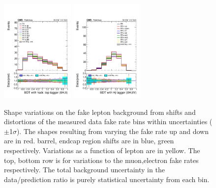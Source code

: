\begin{figure}[htb]
        \includegraphics[width=0.32\textwidth]{ch10_figs/kinMVA_2lss_e_ttbar_withBDTv8.pdf}
        \includegraphics[width=0.32\textwidth]{ch10_figs/kinMVA_2lss_e_ttV_withHj.pdf}
        \caption[Variations in discriminant shape due to fake rate systematics]{Shape variations on the fake lepton background from shifts and distortions
          of the measured data fake rate bins within uncertainties ($\pm$1$\sigma$). 
          The shapes resulting from varying the fake rate up and down are in red. barrel, endcap region shifts are in blue, green respectively. Variations as a function
          of lepton \pt are in yellow. The top, bottom row is for variations to the muon,electron fake rates respectively. The total background uncertainty in the
          data/prediction ratio is purely statistical uncertainty from each bin.}
        \label{fig:FRvars_shape}
\end{figure}

